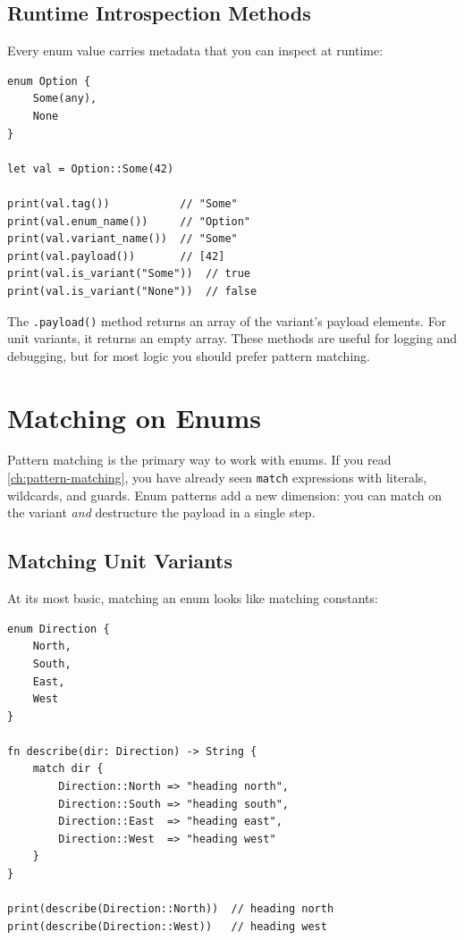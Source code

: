 \subsection{Runtime Introspection Methods}

Every enum value carries metadata that you can inspect at runtime:

\begin{lstlisting}[language=Lattice, caption={Enum introspection methods}]
enum Option {
    Some(any),
    None
}

let val = Option::Some(42)

print(val.tag())           // "Some"
print(val.enum_name())     // "Option"
print(val.variant_name())  // "Some"
print(val.payload())       // [42]
print(val.is_variant("Some"))  // true
print(val.is_variant("None"))  // false
\end{lstlisting}

The \lstinline|.payload()| method returns an array of the variant's payload
elements. For unit variants, it returns an empty array. These methods are
useful for logging and debugging, but for most logic you should prefer
pattern matching.

\section{Matching on Enums}\label{sec:enum-matching}

Pattern matching is the primary way to work with enums. If you read
\cref{ch:pattern-matching}, you have already seen \lstinline|match|
expressions with literals, wildcards, and guards. Enum patterns add a new
dimension: you can match on the variant \emph{and} destructure the payload
in a single step.

\subsection{Matching Unit Variants}

At its most basic, matching an enum looks like matching constants:

\begin{lstlisting}[language=Lattice, caption={Matching unit variants}]
enum Direction {
    North,
    South,
    East,
    West
}

fn describe(dir: Direction) -> String {
    match dir {
        Direction::North => "heading north",
        Direction::South => "heading south",
        Direction::East  => "heading east",
        Direction::West  => "heading west"
    }
}

print(describe(Direction::North))  // heading north
print(describe(Direction::West))   // heading west
\end{lstlisting}

